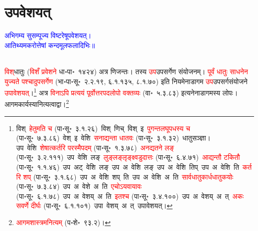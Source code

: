 \section[उपवेशयत्]{उपवेशयत्}
\centering\textcolor{blue}{अभिगम्य सुसम्पूज्य विष्टरेषूपवेशयत्।\nopagebreak\\
आतिथ्यमकरोत्तेषां कन्दमूलफलादिभिः॥}\nopagebreak\\
\\
\fontsize{14}{21}\selectfont\begin{sloppypar}\justifying\noindent\hspace{10mm} \textcolor{red}{विश्‌}\-धातुः (\textcolor{red}{विशँ प्रवेशने} धा॰पा॰~१४२४) अत्र णिजन्तः। तस्य \textcolor{red}{उप}\-उपसर्गेण संयोजनम्। \textcolor{red}{पूर्वं धातुः साधनेन युज्यते पश्चादुपसर्गेण} (भा॰पा॰सू॰~२.२.१९, ६.१.१३५, ८.१.७०) इति नियमेनाडागम \textcolor{red}{उप}\-उपसर्ग\-संयोजने \textcolor{red}{उपावेशयत्}।\footnote{विश्~\arrow \textcolor{red}{हेतुमति च} (पा॰सू॰~३.१.२६)~\arrow विश्~णिच्~\arrow विश्~इ~\arrow \textcolor{red}{पुगन्त\-लघूपधस्य च} (पा॰सू॰~७.३.८६)~\arrow वेश्~इ~\arrow वेशि~\arrow \textcolor{red}{सनाद्यन्ता धातवः} (पा॰सू॰~३.१.३२)~\arrow धातु\-सञ्ज्ञा। उप~वेशि~\arrow \textcolor{red}{शेषात्कर्तरि परस्मैपदम्} (पा॰सू॰~१.३.७८)~\arrow \textcolor{red}{अनद्यतने लङ्} (पा॰सू॰~३.२.१११)~\arrow उप~वेशि~लङ्~\arrow \textcolor{red}{लुङ्लङ्लृङ्क्ष्वडुदात्तः} (पा॰सू॰~६.४.७१)~\arrow \textcolor{red}{आद्यन्तौ टकितौ} (पा॰सू॰~१.१.४६)~\arrow उप~अट्~वेशि~लङ्~\arrow उप~अ~वेशि~लङ्~\arrow उप~अ~वेशि~तिप्~\arrow उप~अ~वेशि~ति~\arrow \textcolor{red}{कर्तरि शप्‌} (पा॰सू॰~३.१.६८)~\arrow उप~अ~वेशि~शप्~ति~\arrow उप~अ~वेशि~अ~ति~\arrow \textcolor{red}{सार्वधातुकार्ध\-धातुकयोः} (पा॰सू॰~७.३.८४)~\arrow उप~अ~वेशे~अ~ति~\arrow \textcolor{red}{एचोऽयवायावः} (पा॰सू॰~६.१.७८)~\arrow उप~अ~वेशय्~अ~ति~\arrow \textcolor{red}{इतश्च} (पा॰सू॰~३.४.१००)~\arrow उप~अ~वेशय्~अ~त्~\arrow \textcolor{red}{अकः सवर्णे दीर्घः} (पा॰सू॰~६.१.१०१)~\arrow उपा~वेशय्~अ~त्~\arrow उपावेशयत्।} अत्र \textcolor{red}{विनाऽपि प्रत्ययं पूर्वोत्तर\-पद\-लोपो वक्तव्यः} (वा॰~५.३.८३) इत्यनेनाडागमस्य लोपः। आगम\-कार्यस्यानित्यत्वाद्वा।\footnote{\textcolor{red}{आगम\-शास्त्रमनित्यम्} (प॰शे॰~९३.२)।}\end{sloppypar}
